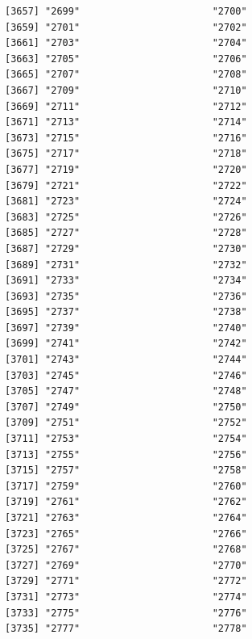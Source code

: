 \documentclass[
  letterpaper,
  DIV=11,
  numbers=noendperiod]{scrreprt}
\begin{document}
\begin{verbatim}
[3657] "2699"                       "2700"                      
[3659] "2701"                       "2702"                      
[3661] "2703"                       "2704"                      
[3663] "2705"                       "2706"                      
[3665] "2707"                       "2708"                      
[3667] "2709"                       "2710"                      
[3669] "2711"                       "2712"                      
[3671] "2713"                       "2714"                      
[3673] "2715"                       "2716"                      
[3675] "2717"                       "2718"                      
[3677] "2719"                       "2720"                      
[3679] "2721"                       "2722"                      
[3681] "2723"                       "2724"                      
[3683] "2725"                       "2726"                      
[3685] "2727"                       "2728"                      
[3687] "2729"                       "2730"                      
[3689] "2731"                       "2732"                      
[3691] "2733"                       "2734"                      
[3693] "2735"                       "2736"                      
[3695] "2737"                       "2738"                      
[3697] "2739"                       "2740"                      
[3699] "2741"                       "2742"                      
[3701] "2743"                       "2744"                      
[3703] "2745"                       "2746"                      
[3705] "2747"                       "2748"                      
[3707] "2749"                       "2750"                      
[3709] "2751"                       "2752"                      
[3711] "2753"                       "2754"                      
[3713] "2755"                       "2756"                      
[3715] "2757"                       "2758"                      
[3717] "2759"                       "2760"                      
[3719] "2761"                       "2762"                      
[3721] "2763"                       "2764"                      
[3723] "2765"                       "2766"                      
[3725] "2767"                       "2768"                      
[3727] "2769"                       "2770"                      
[3729] "2771"                       "2772"                      
[3731] "2773"                       "2774"                      
[3733] "2775"                       "2776"                      
[3735] "2777"                       "2778"                      

\end{verbatim}
\end{document}
